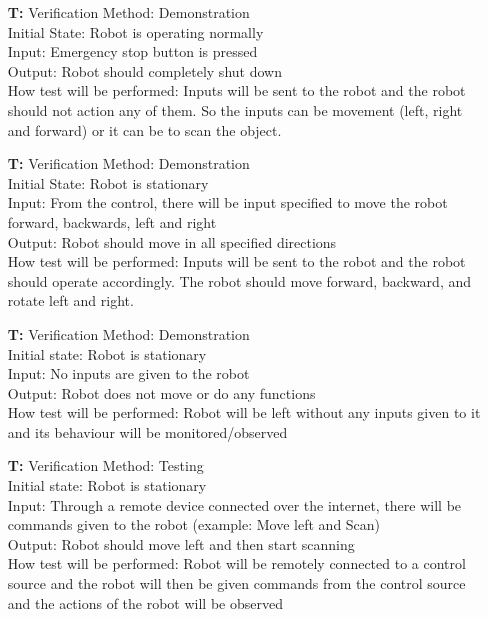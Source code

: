 \documentclass[12pt, titlepage]{article}
\newcounter{tnum} %
\begin{document}
\begin{itemize}
\item[\textbf{T\refstepcounter{tnum}\thetnum:}]
Verification Method: Demonstration\\
Initial State: Robot is operating normally \\ 
Input: Emergency stop button is pressed \\ 
Output: Robot should completely shut down \\
How test will be performed: Inputs will be sent to the robot and the robot should not action any of them. So the inputs can be movement (left, right and forward) or it can be to scan the object.  \\

\item[\textbf{T\refstepcounter{tnum}\thetnum:}]
Verification Method: Demonstration\\
Initial State: Robot is stationary \\
Input: From the control, there will be input specified to move the robot forward, backwards, left and right \\
Output: Robot should move in all specified directions \\
How test will be performed: Inputs will be sent to the robot and the robot should operate accordingly. The robot should move forward, backward, and rotate left and right. \\

\item[\textbf{T\refstepcounter{tnum}\thetnum:}]
Verification Method: Demonstration\\
Initial state: Robot is stationary \\
Input: No inputs are given to the robot \\
Output: Robot does not move or do any functions \\
How test will be performed: Robot will be left without any inputs given to it and its behaviour will be monitored/observed \\


\item[\textbf{T\refstepcounter{tnum}\thetnum:}]
Verification Method: Testing	\\
Initial state: Robot is stationary \\
Input: Through a remote device connected over the internet, there will be commands given to the robot (example: Move left and Scan) \\
Output: Robot should move left and then start scanning  \\
How test will be performed: Robot will be remotely connected to a control source and the robot will then be given commands from the control source and the actions of the robot will be observed \\


\end{itemize}
\end{document}
